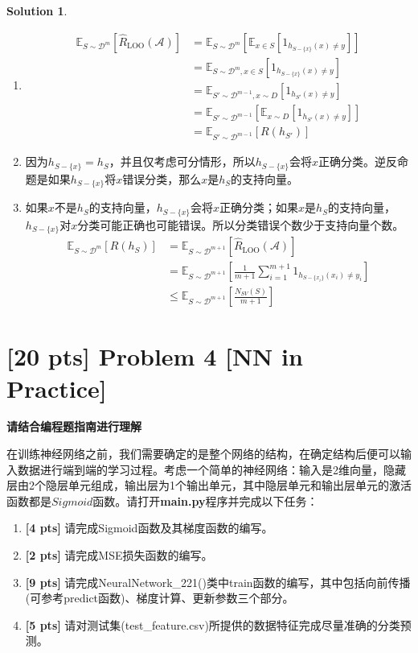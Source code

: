 \documentclass[a4paper,UTF8]{article}
\theoremstyle{definition}
\newtheorem*{solution}{Solution}
\begin{document}
\begin{solution}
	~\\
	\begin{enumerate}[(1)]
		\item 
		\begin{align*}
			\mathbb{E}_{S\sim\mathcal{D}^m}[\hat{R}_{\text{LOO}}(\mathcal{A})]
			&=\mathbb{E}_{S\sim\mathcal{D}^m}[\mathbb{E}_{x\in S}[1_{h_{S-\{x\}}(x)\neq y}]]\\
			&=\mathbb{E}_{S\sim\mathcal{D}^m,x\in S}[1_{h_{S-\{x\}}(x)\neq y}]\\
			&=\mathbb{E}_{S'\sim\mathcal{D}^{m-1},x\sim D}[1_{h_{S'}(x)\neq y}]\\
			&=\mathbb{E}_{S'\sim\mathcal{D}^{m-1}}[\mathbb{E}_{x\sim D}[1_{h_{S'}(x)\neq y}]]\\
			&=\mathbb{E}_{S'\sim\mathcal{D}^{m-1}}[R(h_{S'})]
		\end{align*}
		\item 
		因为$h_{S-\{x\}}=h_S$，并且仅考虑可分情形，所以$h_{S-\{x\}}$会将$x$正确分类。逆反命题是如果$h_{S-\{x\}}$将$x$错误分类，那么$x$是$h_S$的支持向量。
		\item
		如果$x$不是$h_S$的支持向量，$h_{S-\{x\}}$会将$x$正确分类；如果$x$是$h_S$的支持向量，$h_{S-\{x\}}$对$x$分类可能正确也可能错误。所以分类错误个数少于支持向量个数。
		\begin{align*}
		\mathbb{E}_{S\sim\mathcal{D}^m}[R(h_S)]
		&=\mathbb{E}_{S\sim\mathcal{D}^{m+1}}[\hat{R}_{\text{LOO} }(\mathcal{A})]\\
		&=\mathbb{E}_{S\sim\mathcal{D}^{m+1}}\left[\frac{1}{m+1} \sum_{i=1}^{m+1} 1_{h_{S-\{x_i\}}(x_i)\neq y_i}\right]\\
		&\leq \mathbb{E}_{S\sim\mathcal{D}^{m+1}}\left[ \frac{N_{SV}(S)}{m+1}\right]
		\end{align*}
	\end{enumerate}
\end{solution}

\section*{[20 pts] Problem 4 [NN in Practice]}

\textbf{请结合编程题指南进行理解}
\par 在训练神经网络之前，我们需要确定的是整个网络的结构，在确定结构后便可以输入数据进行端到端的学习过程。考虑一个简单的神经网络：输入是2维向量，隐藏层由2个隐层单元组成，输出层为1个输出单元，其中隐层单元和输出层单元的激活函数都是$Sigmoid$函数。请打开\textbf{main.py}程序并完成以下任务：
\begin{enumerate}[(1)]
	\item \textbf{[4 pts]} 请完成Sigmoid函数及其梯度函数的编写。
	\item \textbf{[2 pts]} 请完成MSE损失函数的编写。
	\item \textbf{[9 pts]} 请完成NeuralNetwork\_221()类中train函数的编写，其中包括向前传播(可参考predict函数)、梯度计算、更新参数三个部分。
	\item \textbf{[5 pts]} 请对测试集(test\_feature.csv)所提供的数据特征完成尽量准确的分类预测。
\end{enumerate}
\end{document}
